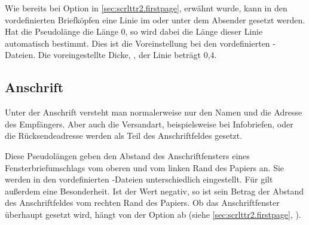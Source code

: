 \begin{Declaration}
\end{Declaration}
Wie bereits bei Option
 in
\autoref{sec:scrlttr2.firstpage}, 
erwähnt wurde, kann in den vordefinierten Briefköpfen eine Linie im oder unter
dem Absender gesetzt werden. Hat die Pseudolänge
 die Länge 0, so wird dabei die Länge dieser Linie
automatisch bestimmt. Dies ist die Voreinstellung bei den vordefinierten
-Dateien. %
\iffalse %
Der Wert kann mit \DescRef{\LabelBase.cmd.setplength} (siehe
\DescPageRef{scrlttr2-experts.cmd.setplength}) in eigenen \File{lco}-Dateien
aber auch abweichend gesetzt werden. %
\fi%
Die voreingestellte Dicke,
, der Linie beträgt 0,4.%
\EndIndexGroup
%
\EndIndexGroup


\subsection{Anschrift}
%
\BeginIndexGroup
{}%

Unter der Anschrift versteht man normalerweise nur den Namen und die Adresse
des Empfängers. %
\iffalse%
Als \iffree{erste }{}Erweiterung zur Anschrift kann die
Versandart betrachtet werden, die etwa bei \iffree{Einschreiben oder
}{}Infobriefen zur Anwendung kommt. Bei Fensterbriefumschlägen wird auch die
sogenannte Rücksendeadresse \iffree{zur Anschrift}{dazu} gezählt, da sie im
Anschriftfenster zu sehen \iffree{sein wird}{ist}. Die Anschrift folgt
unmittelbar auf den Briefkopf.%
\else%
Aber auch die Versandart, beispielsweise bei Infobriefen, oder die
Rücksendeadresse werden als Teil des Anschriftfeldes gesetzt.%
\fi


\begin{Declaration}
\end{Declaration}
Diese Pseudolängen geben den Abstand des Anschriftfensters eines
Fensterbriefumschlags vom oberen und vom linken Rand des Papiers an.  Sie
werden in den vordefinierten
-Dateien
unterschiedlich eingestellt.  Für  gilt außerdem eine
Besonderheit. Ist der Wert negativ, so ist sein Betrag der Abstand des
Anschriftfeldes vom rechten Rand des Papiers. %
 Ob das Anschriftfenster überhaupt gesetzt wird, hängt von der Option
 ab (siehe \autoref{sec:scrlttr2.firstpage},
).%
\EndIndexGroup


